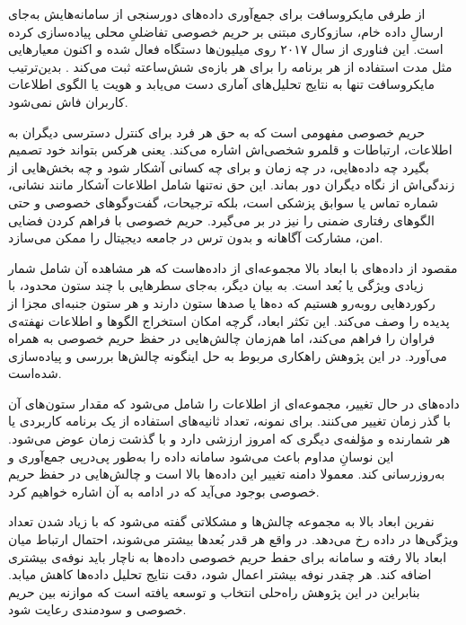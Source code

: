 از طرفی مایکروسافت برای جمع‌آوری داده‌های دورسنجی از سامانه‌هایش به‌جای ارسالِ داده خام، سازوکاری مبتنی بر حریم خصوصی تفاضلیِ محلی پیاده‌سازی کرده است. این فناوری از سال ۲۰۱۷ روی میلیون‌ها دستگاه فعال شده و اکنون معیارهایی مثل مدت استفاده از هر برنامه را برای هر بازه‌ی شش‌ساعته ثبت می‌کند .  بدین‌ترتیب مایکروسافت تنها به نتایج تحلیل‌های آماری دست می‌یابد و هویت یا الگوی اطلاعات کاربران فاش نمی‌شود.



حریم خصوصی مفهومی است که به حق هر فرد برای کنترل دسترسی دیگران به اطلاعات، ارتباطات و قلمرو شخصی‌اش اشاره می‌کند. یعنی هرکس بتواند خود تصمیم بگیرد چه داده‌هایی، در چه زمان و برای چه کسانی آشکار شود و چه بخش‌هایی از زندگی‌اش از نگاه دیگران دور بماند. این حق نه‌تنها شامل اطلاعات آشکار مانند نشانی، شماره تماس یا سوابق پزشکی است، بلکه ترجیحات، گفت‌وگوهای خصوصی و حتی الگوهای رفتاری ضمنی را نیز در بر می‌گیرد. حریم خصوصی با فراهم کردن فضایی امن، مشارکت آگاهانه و بدون ترس در جامعه دیجیتال را ممکن می‌سازد.


مقصود از داده‌های با ابعاد بالا مجموعه‌ای از داده‌هاست که هر مشاهده آن شامل شمار زیادی ویژگی یا بُعد است. به بیان دیگر، به‌جای سطرهایی با چند ستون محدود، با رکوردهایی روبه‌رو هستیم که ده‌ها یا صدها ستون دارند و هر ستون جنبه‌ای مجزا از پدیده را وصف می‌کند. این تکثر ابعاد، گرچه امکان استخراج الگوها و اطلاعات نهفته‌ی فراوان را فراهم می‌کند، اما هم‌زمان چالش‌هایی در حفظ حریم خصوصی به همراه می‌آورد. در این پژوهش راهکاری مربوط به حل اینگونه چالش‌ها بررسی و پیاده‌سازی شده‌است.


داده‌های در حال تغییر، مجموعه‌ای از اطلاعات را شامل می‌شود که مقدار ستون‌های آن با گذر زمان تغییر می‌کنند. برای نمونه، تعداد ثانیه‌های استفاده از یک برنامه کاربردی یا هر شمارنده و مؤلفه‌ی دیگری که امروز ارزشی دارد و با گذشت زمان عوض می‌شود. این نوسانِ مداوم باعث می‌شود سامانه داده را به‌طور پی‌درپی جمع‌آوری و به‌روزرسانی کند. معمولا دامنه تغییر این داده‌ها بالا است و چالش‌هایی در حفظ حریم خصوصی بوجود می‌آید که در ادامه به آن اشاره خواهیم کرد. 

نفرین ابعاد بالا به مجموعه چالش‌ها و مشکلاتی گفته می‌شود که با زیاد شدن تعداد ویژگی‌ها در داده رخ می‌دهد. در واقع هر قدر بُعد‌ها بیشتر می‌شوند، احتمال ارتباط میان ابعاد بالا رفته و سامانه برای حفط حریم خصوصی داده‌‌ها به ناچار باید نوفه‌ی بیشتری اضافه کند. هر چقدر نوفه بیشتر اعمال شود، دقت نتایج تحلیل داده‌ها کاهش میابد. بنابراین در این پژوهش راه‌حلی انتخاب و توسعه یافته است که موازنه بین حریم خصوصی و سودمندی رعایت شود.


